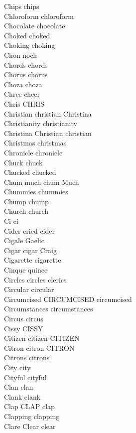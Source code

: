 Chips chips\\
Chloroform chloroform\\
Chocolate chocolate\\
Choked choked\\
Choking choking\\
Chon noch\\
Chords chords\\
Chorus chorus\\
Choza choza\\
Chree cheer\\
Chris CHRIS\\
Christian christian Christina\\
Christianity christianity\\
Christina Christian christian\\
Christmas christmas\\
Chronicle chronicle\\
Chuck chuck\\
Chucked chucked\\
Chum much chum Much\\
Chummies chummies\\
Chump chump\\
Church church\\
Ci ci\\
Cider cried cider\\
Cigale Gaelic\\
Cigar cigar Craig\\
Cigarette cigarette\\
Cinque quince\\
Circles circles clerics\\
Circular circular\\
Circumcised CIRCUMCISED circumcised\\
Circumstances circumstances\\
Circus circus\\
Cissy CISSY\\
Citizen citizen CITIZEN\\
Citron citron CITRON\\
Citrons citrons\\
City city\\
Cityful cityful\\
Clan clan\\
Clank clank\\
Clap CLAP clap\\
Clapping clapping\\
Clare Clear clear\\
